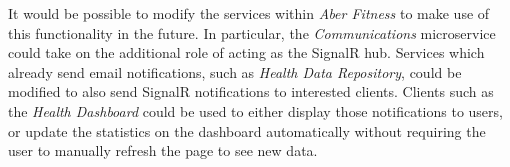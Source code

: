 It would be possible to modify the services within \textit{Aber Fitness} to make use of this functionality in the future. In particular, the \textit{Communications} microservice could take on the additional role of acting as the SignalR hub. Services which already send email notifications, such as \textit{Health Data Repository}, could be modified to also send SignalR notifications to interested clients. Clients such as the \textit{Health Dashboard} could be used to either display those notifications to users, or update the statistics on the dashboard automatically without requiring the user to manually refresh the page to see new data.

